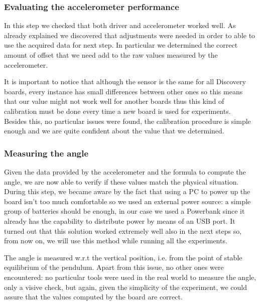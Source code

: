 \subsubsection{Evaluating the accelerometer performance}
In this step we checked that both driver and accelerometer worked well. As already explained we discovered that adjustments were needed in order to able to use the acquired data for next step. In particular we determined the correct amount of offset that we need add to the raw values measured by the accelerometer. \par It is important to notice that although the sensor is the same for all Discovery boards, every instance has small differences between other ones so this means that our value might not work well for another boards thus this kind of calibration must be done every time a new board is used for experiments. \\ Besides this, no particular issues were found, the calibration procedure is simple enough and we are quite confident about the value that we determined.
\subsubsection{Measuring the angle}
Given the data provided by the accelerometer and the formula to compute the angle, we are now able to verify if these values match the physical situation. During this step, we became aware by the fact that using a PC to power up the board isn't too much comfortable so we used an external power source: a simple group of batteries should be enough, in our case we used a Powerbank since it already has the capability to distribute power by means of an USB port. It turned out that this solution worked extremely well also in the next steps so, from now on, we will use this method while running all the experiments. \par The angle is measured w.r.t the vertical position, i.e. from the point of stable equilibrium of the pendulum. Apart from this issue, no other ones were encountered: no particular tools were used in the real world to measure the angle, only a visive check, but again, given the simplicity of the experiment, we could assure that the values computed by the board are correct. 
